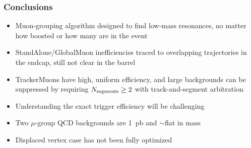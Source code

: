 \documentclass[compress]{beamer}
\newcommand{\s}[1]{{\mbox{\scriptsize #1}}}
\begin{document}
\begin{frame}
\frametitle{Conclusions}
\begin{itemize}\setlength{\itemsep}{0.2 cm}
\item Muon-grouping algorithm designed to find low-mass resonances, no
  matter how boosted or how many are in the event
\item StandAlone/GlobalMuon inefficiencies traced to overlapping
  trajectories in the endcap, still not clear in the barrel
\item TrackerMuons have high, uniform efficiency, and large
  backgrounds can be suppressed by requiring $N_\s{segments} \ge 2$
  with track-and-segment arbitration
\item Understanding the exact trigger efficiency will be challenging
\item Two $\mu$-group QCD backgrounds are 1~pb and $\sim$flat in mass
\item Displaced vertex case has not been fully optimized
\end{itemize}
\label{numpages}
\end{frame}
\end{document}
